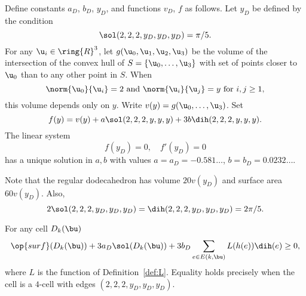 \begin{definition}[$a_D$,~$b_D$,~$y_D$,~$v_D$,~$f$]
Define constants $a_D$, $b_D$, $y_D$, and functions $v_D$, $f$ as follows.  Let $y_D$ be defined
by the condition
\begin{displaymath}
\sol(2,2,2,y_D,y_D,y_D) = \pi/5.
\end{displaymath}
For any $\u_i\in\ring{R}^3$,   let $g(\u_0,\u_1,\u_2,\u_3)$ be
the volume of the intersection of the convex hull of $S=\{\u_0,\ldots,\u_3\}$ with set of
points closer to $ \u_0$ than to any other point in $S$.  
When 
\begin{equation}\label{eqn:uy}
\norm{\u_0}{\u_i}=2\text{ and }\norm{ \u_i}{ \u_j} = y\text{ for }i,j\ge 1,
\end{equation} 
this
volume depends only on $y$. Write $v(y) = g(\u_0,\ldots,\u_3)$.  Set
\begin{displaymath}
f(y) = v(y) + a \sol(2,2,2,y,y,y) + 3 b \dih(2,2,2,y,y,y).
\end{displaymath}
The linear system
\begin{equation}\label{eqn:fyD}
f(y_D) = 0,\quad f'(y_D) = 0
\end{equation}
has a unique solution in $a,b$ with values $a=a_D=-0.581\ldots$,
$b=b_D=0.0232\ldots$.
\end{definition}
%
%
%
%
%
%

Note that the regular dodecahedron has volume $20 v(y_D)$ and surface
area $60 v(y_D)$.  Also,
\begin{equation}
2\sol(2,2,2,y_D,y_D,y_D) =\dih(2,2,2,y_D,y_D,y_D)=2\pi/5.
\end{equation}
%
%

\begin{lemma}\label{lemma:D-local}  
For any cell $D_k(\bu)$
\begin{displaymath}
\op{surf}(D_k(\bu)) + 3 a_D \sol(D_k(\bu)) + 3 b_D \sum_{e\in E(k,\bu)} L(h(e)) \dih(e) \ge 0,
\end{displaymath}
where $L$ is the function of Definition~\ref{def:L}.
Equality  holds precisely when the cell is a $4$-cell with edges
$(2,2,2,y_D,y_D,y_D)$.
\end{lemma}
%

